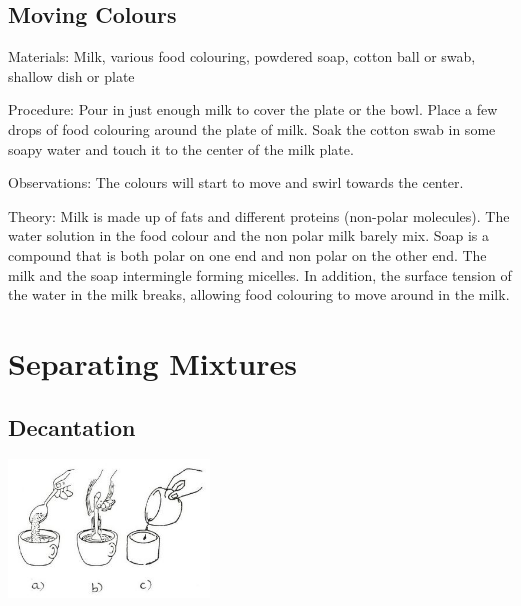 \begin{multicols}{2}
\subsection{Moving Colours} %


\begin{description*}
\item[Materials:]{Milk, various food colouring, powdered soap, cotton ball or swab, shallow dish or plate}
\item[Procedure:]{Pour in just enough milk to cover the plate or the bowl. Place a few drops of
food colouring around the plate of milk. Soak
the cotton swab in some soapy water and touch it to the center of the
milk plate. }
\item[Observations:]{The colours will start to move and
swirl towards the center.}
\item[Theory:]{Milk is made up of fats and different proteins (non-polar molecules). The water solution in the food colour and the non polar milk barely mix. Soap
is a compound that is both polar on one end and non polar on the other
end. The milk and the soap intermingle forming micelles. In addition,
the surface tension of the water in the milk breaks, allowing
food colouring to move around in the milk. }
\end{description*}


\section*{Separating Mixtures}


\subsection{Decantation}

\begin{center}
\includegraphics[width=0.4\textwidth]{./img/source/decantation.jpg}
\end{center}


\end{multicols}
